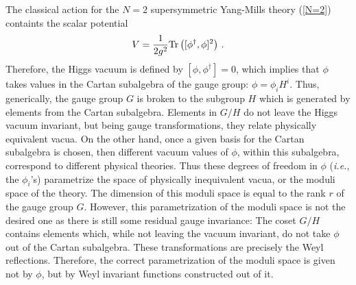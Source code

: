 The classical action for the $N=2$ supersymmetric Yang-Mills theory
(\ref{N=2}) containts the scalar potential
$$
V={1\over 2g^2}{\rm Tr}\left([\phi^\dagger,\phi]^2\right)\,.
$$
Therefore, the Higgs vacuum is defined by $[\phi,\phi^\dagger]=0$,
which implies that $\phi$ takes values in the Cartan subalgebra of the
gauge group: $\phi= \phi_i H^i$. Thus, generically, the gauge group
$G$ is broken to the subgroup $H$ which is generated by elements from
the Cartan subalgebra. Elements in $G/H$ do not leave the Higgs vacuum
invariant, but being gauge transformations, they relate physically
equivalent vacua. On the other hand, once a given basis for the Cartan
subalgebra is chosen, then different vacuum values of $\phi$, within
this subalgebra, correspond to different physical theories. Thus these
degrees of freedom in $\phi$ ({\it i.e.}, the $\phi_i$'s) parametrize
the space of physically inequivalent vacua, or the moduli space of the
theory.  The dimension of this moduli space is equal to the rank $r$
of the gauge group $G$. However, this parametrization of the moduli
space is not the desired one as there is still some residual gauge
invariance: The coset $G/H$ contains elements which, while not leaving
the vacuum invariant, do not take $\phi$ out of the Cartan
subalgebra. These transformations are precisely the Weyl 
reflections. Therefore, the correct parametrization of the moduli
space is given not by $\phi$, but by Weyl invariant functions
constructed out of it.

